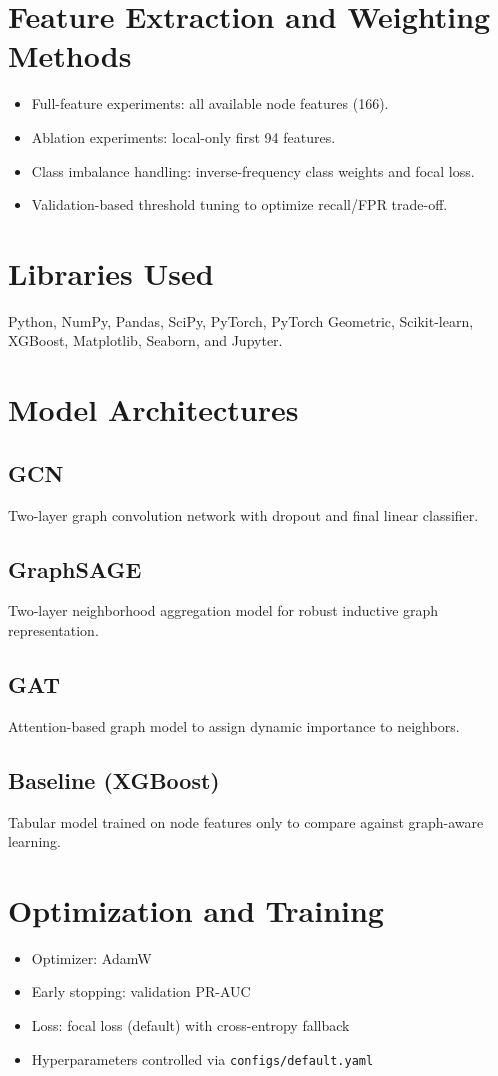 \documentclass[12pt,a4paper]{article}
\begin{document}
\section{Feature Extraction and Weighting Methods}
\begin{itemize}
\item Full-feature experiments: all available node features (166).
\item Ablation experiments: local-only first 94 features.
\item Class imbalance handling: inverse-frequency class weights and focal loss.
\item Validation-based threshold tuning to optimize recall/FPR trade-off.
\end{itemize}

\section{Libraries Used}
Python, NumPy, Pandas, SciPy, PyTorch, PyTorch Geometric, Scikit-learn, XGBoost, Matplotlib, Seaborn, and Jupyter.

\section{Model Architectures}
\subsection{GCN}
Two-layer graph convolution network with dropout and final linear classifier.
\subsection{GraphSAGE}
Two-layer neighborhood aggregation model for robust inductive graph representation.
\subsection{GAT}
Attention-based graph model to assign dynamic importance to neighbors.
\subsection{Baseline (XGBoost)}
Tabular model trained on node features only to compare against graph-aware learning.

\section{Optimization and Training}
\begin{itemize}
\item Optimizer: AdamW
\item Early stopping: validation PR-AUC
\item Loss: focal loss (default) with cross-entropy fallback
\item Hyperparameters controlled via \texttt{configs/default.yaml}
\end{itemize}
\end{document}
